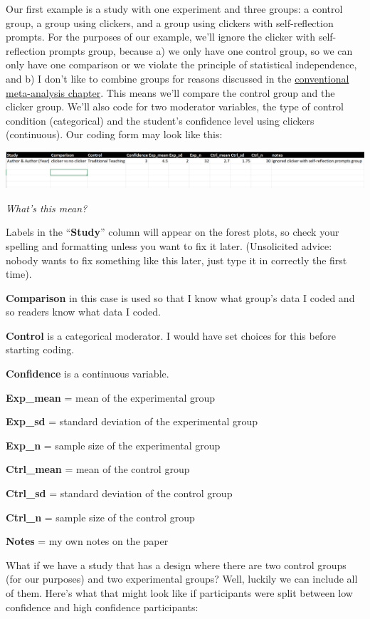 \documentclass[
]{book}
\begin{document}
Our first example is a study with one experiment and three groups: a control group, a group using clickers, and a group using clickers with self-reflection prompts. For the purposes of our example, we'll ignore the clicker with self-reflection prompts group, because a) we only have one control group, so we can only have one comparison or we violate the principle of statistical independence, and b) I don't like to combine groups for reasons discussed in the \protect\hyperlink{crossmeta}{conventional meta-analysis chapter}. This means we'll compare the control group and the clicker group. We'll also code for two moderator variables, the type of control condition (categorical) and the student's confidence level using clickers (continuous). Our coding form may look like this:

\includegraphics[width=2\textwidth,height=\textheight]{images/MA_coding.PNG}

\emph{What's this mean?}

Labels in the ``\textbf{Study}'' column will appear on the forest plots, so check your spelling and formatting unless you want to fix it later. (Unsolicited advice: nobody wants to fix something like this later, just type it in correctly the first time).

\textbf{Comparison} in this case is used so that I know what group's data I coded and so readers know what data I coded.

\textbf{Control} is a categorical moderator. I would have set choices for this before starting coding.

\textbf{Confidence} is a continuous variable.

\textbf{Exp\_mean} = mean of the experimental group

\textbf{Exp\_sd} = standard deviation of the experimental group

\textbf{Exp\_n} = sample size of the experimental group

\textbf{Ctrl\_mean} = mean of the control group

\textbf{Ctrl\_sd} = standard deviation of the control group

\textbf{Ctrl\_n} = sample size of the control group

\textbf{Notes} = my own notes on the paper

What if we have a study that has a design where there are two control groups (for our purposes) and two experimental groups? Well, luckily we can include all of them. Here's what that might look like if participants were split between low confidence and high confidence participants:
\end{document}
